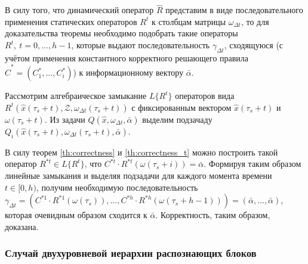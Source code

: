 \begin{Proof}
	В силу того, что динамический оператор $\hat{R}$ представим в виде последовательного применения статических операторов $R^t$ к столбцам матрицы $\omega_{\Delta{t}}$, то для доказательства теоремы необходимо подобрать такие операторы $R^t,\ t=0,\dots,h-1$, которые выдают последовательность $\gamma_{\Delta{t}}$, сходящуюся (с учётом применения константного корректного решающего правила $\hat{C}^*=(C_1^*,\dots,C_i^*)$) к информационному вектору $\bar{\alpha}$.
	
	Рассмотрим алгебраическое замыкание $L\{R^t\}$ операторов вида $R^t(\hat{x}(\tau_s+t), \mathcal Z, \omega_{\Delta t}(\tau_s+t))$ с фиксированным вектором $\hat{x}(\tau_s+t)$ и $\omega(\tau_s+t)$. Из задачи $\hat{Q}(\hat{x}, \omega_{{\Delta}t}, \bar{\alpha})$ выделим подзачаду $Q_i(\hat x(\tau_s+t), \omega_{\Delta t}(\tau_s+t),\bar\alpha)$. 

	В силу теорем \ref{th:correctness} и \ref{th:correctness_t} можно построить такой оператор $R^{*t}\in{L}\{R^t\}$, что $C^{*t}\cdot R^{*t}(\omega(\tau_s+i))=\bar{\alpha}$. Формируя таким образом линейные замыкания и выделяя подзадачи для каждого момента времени $t\in[0,h)$, получим необходимую последовательность $\gamma_{\Delta t}=(C^{*1}\cdot R^{*1}(\omega(\tau_s)), \dots, C^{*h}\cdot R^{*h}(\omega(\tau_s+h-1)))=(\bar{\alpha},\dots,\bar{\alpha})$, которая очевидным образом сходится к $\bar{\alpha}$. Корректность, таким образом, доказана.		
\end{Proof}
	
\subsubsection{Случай двухуровневой иерархии распознающих блоков}

